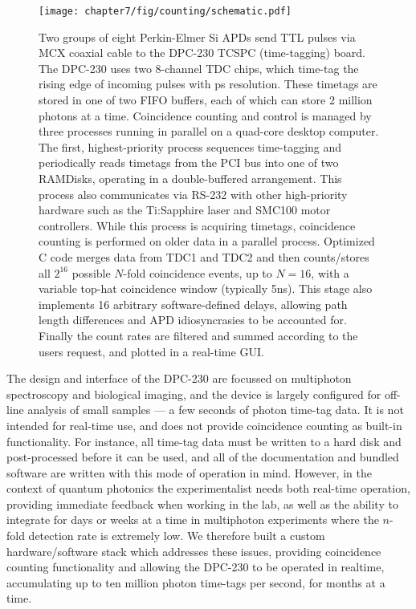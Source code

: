 \begin{figure}[t!]
\centering
\texttt{[image: chapter7/fig/counting/schematic.pdf]}
\caption[DPC-230 coincidence-counting setup]{
Two groups of eight Perkin-Elmer Si APDs send TTL pulses via MCX coaxial cable to the DPC-230 TCSPC (time-tagging) board. The DPC-230 uses two 8-channel TDC chips, which time-tag the rising edge of incoming pulses with ps resolution. These timetags are stored in one of two FIFO buffers, each of which can store 2 million photons at a time. Coincidence counting and control is managed by three processes running in parallel on a quad-core desktop computer.  The first, highest-priority process sequences time-tagging and  periodically reads timetags from the PCI bus into one of two RAMDisks, operating in a double-buffered arrangement. This process also communicates via RS-232 with other high-priority hardware such as the Ti:Sapphire laser and SMC100 motor controllers. While this process is acquiring timetags, coincidence counting is performed on older data in a parallel process. Optimized C code merges data from TDC1 and TDC2 and then counts/stores all $2^{16}$ possible $N$-fold coincidence events, up to $N=16$, with a variable top-hat coincidence window (typically 5ns). This stage also implements 16 arbitrary software-defined delays, allowing path length differences and APD idiosyncrasies to be accounted for. Finally the count rates are filtered and summed according to the users request, and plotted in a real-time GUI.
}
\label{fig:counting-schematic}
\end{figure}

The design and interface of the DPC-230 are focussed on multiphoton spectroscopy and biological imaging, and the device is largely configured for off-line analysis of small samples --- a few seconds of photon time-tag data. It is not intended for real-time use, and does not provide coincidence counting as built-in functionality. For instance, all time-tag data must be written to a hard disk and post-processed before it can be used, and all of the documentation and bundled software are written with this mode of operation in mind. However, in the context of quantum photonics the experimentalist needs both real-time operation, providing immediate feedback when working in the lab, as well as the ability to integrate for days or weeks at a time in multiphoton experiments where the $n$-fold detection rate is extremely low.  We therefore built a custom hardware/software stack which addresses these issues, providing coincidence counting functionality and allowing the DPC-230 to be operated in realtime, accumulating up to ten million photon time-tags per second, for months at a time. 

